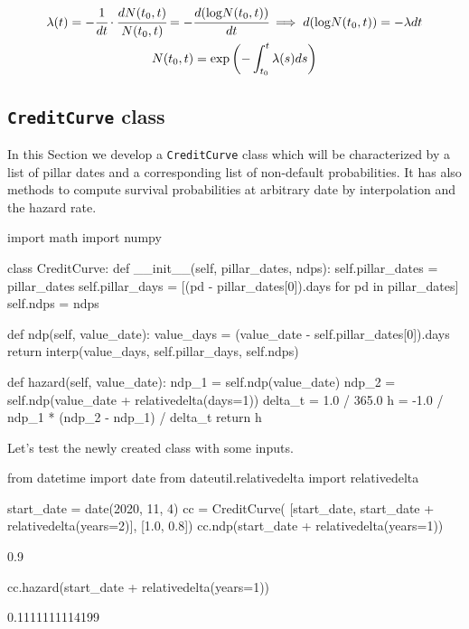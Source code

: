 \begin{equation}
\begin{gathered}
\lambda(t) = -\cfrac{1}{dt}\cdot\cfrac{dN(t_0, t)}{N(t_0, t)} = -\cfrac{d(\textrm{log}N(t_0, t))}{dt} \implies d(\textrm{log}N(t_0, t)) = -\lambda dt\\
N(t_0, t) = \mathrm{exp}\left(-\int_{t_0}^{t}\lambda(s) ds\right)
\end{gathered}
\end{equation}

\subsection{\texttt{CreditCurve} class}

In this Section we develop a \texttt{CreditCurve} class which will be characterized by a list of pillar dates and a corresponding list of non-default probabilities. It has also methods to compute survival probabilities at arbitrary date by interpolation and the hazard rate.
  
\begin{ipython}
import math
import numpy

class CreditCurve:
    def __init__(self, pillar_dates, ndps):
        self.pillar_dates = pillar_dates
        self.pillar_days = [(pd - pillar_dates[0]).days for pd in pillar_dates]
        self.ndps = ndps

    def ndp(self, value_date):
        value_days = (value_date - self.pillar_dates[0]).days
        return interp(value_days, self.pillar_days, self.ndps)

    def hazard(self, value_date):
        ndp_1 = self.ndp(value_date)
        ndp_2 = self.ndp(value_date + relativedelta(days=1))
        delta_t = 1.0 / 365.0
        h = -1.0 / ndp_1 * (ndp_2 - ndp_1) / delta_t
        return h
\end{ipython}
\noindent
Let's test the newly created class with some inputs.
\begin{ipython}
from datetime import date
from dateutil.relativedelta import relativedelta

start_date = date(2020, 11, 4)
cc = CreditCurve(
    [start_date, start_date + relativedelta(years=2)],
    [1.0, 0.8])
cc.ndp(start_date + relativedelta(years=1))
\end{ipython}
\begin{ioutput}
0.9
\end{ioutput}
\begin{ipython}
cc.hazard(start_date + relativedelta(years=1))
\end{ipython}
\begin{ioutput}
0.1111111114199
\end{ioutput}
            
